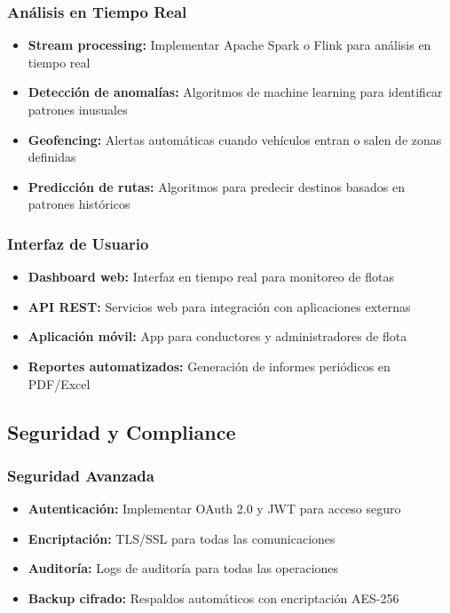 \subsubsection{Análisis en Tiempo Real}
\begin{itemize}
    \item \textbf{Stream processing:} Implementar Apache Spark o Flink para análisis en tiempo real
    \item \textbf{Detección de anomalías:} Algoritmos de machine learning para identificar patrones inusuales
    \item \textbf{Geofencing:} Alertas automáticas cuando vehículos entran o salen de zonas definidas
    \item \textbf{Predicción de rutas:} Algoritmos para predecir destinos basados en patrones históricos
\end{itemize}

\subsubsection{Interfaz de Usuario}
\begin{itemize}
    \item \textbf{Dashboard web:} Interfaz en tiempo real para monitoreo de flotas
    \item \textbf{API REST:} Servicios web para integración con aplicaciones externas
    \item \textbf{Aplicación móvil:} App para conductores y administradores de flota
    \item \textbf{Reportes automatizados:} Generación de informes periódicos en PDF/Excel
\end{itemize}

\subsection{Seguridad y Compliance}

\subsubsection{Seguridad Avanzada}
\begin{itemize}
    \item \textbf{Autenticación:} Implementar OAuth 2.0 y JWT para acceso seguro
    \item \textbf{Encriptación:} TLS/SSL para todas las comunicaciones
    \item \textbf{Auditoría:} Logs de auditoría para todas las operaciones
    \item \textbf{Backup cifrado:} Respaldos automáticos con encriptación AES-256
\end{itemize}

